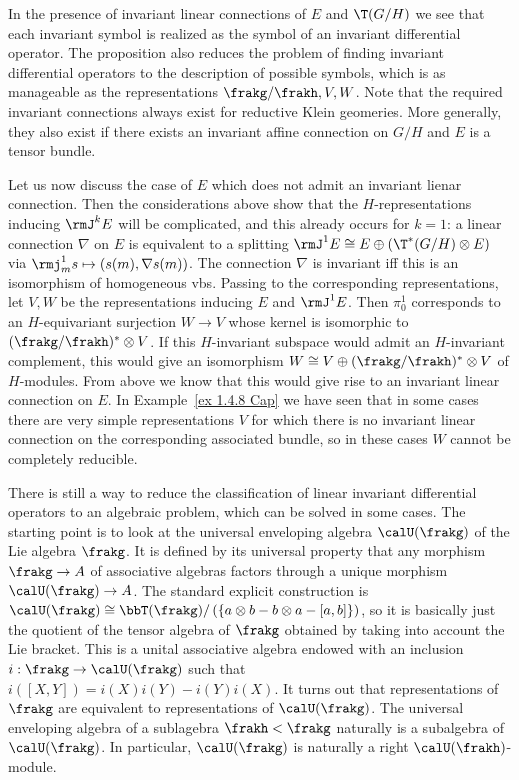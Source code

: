 In the presence of invariant linear connections of $E$ and $\T(G\slash H)$ we see that each invariant symbol is realized as the symbol of an invariant differential operator. The proposition also reduces the problem of finding invariant differential operators to the description of possible symbols, which is as manageable as the representations $\frakg\slash\frakh,V,W$. Note that the required invariant connections always exist for reductive Klein geomeries. More generally, they also exist if there exists an invariant affine connection on $G\slash H$ and $E$ is a tensor bundle.

Let us now discuss the case of $E$ which does not admit an invariant lienar connection. Then the considerations above show that the $H$-representations inducing $\rmJ^k E$ will be complicated, and this already occurs for $k=1$: a linear connection $\nabla$ on $E$ is equivalent to a splitting $\rmJ^1 E\cong E\oplus (\T^\ast (G\slash H)\otimes E)$ via $\rmj^1_m s\mapsto (s(m),\nabla s(m))$. The connection $\nabla$ is invariant iff this is an isomorphism of homogeneous \glspl{vb}. Passing to the corresponding representations, let $V,W$ be the representations inducing $E$ and $\rmJ^1 E$. Then $\pi^1_0$ corresponds to an $H$-equivariant surjection $W\to V$ whose kernel is isomorphic to $(\frakg\slash\frakh)^\ast \otimes V$. If this $H$-invariant subspace would admit an $H$-invariant complement, this would give an isomorphism $W\cong V\oplus (\frakg\slash\frakh)^\ast\otimes V$ of $H$-modules. From above we know that this would give rise to an invariant linear connection on $E$. In Example~\ref{ex 1.4.8 Cap} we have seen that in some cases there are very simple representations $V$ for which there is no invariant linear connection on the corresponding associated bundle, so in these cases $W$ cannot be completely reducible.

There is still a way to reduce the classification of linear invariant differential operators to an algebraic problem, which can be solved in some cases. The starting point is to look at the universal enveloping algebra $\calU(\frakg)$ of the Lie algebra $\frakg$. It is defined by its universal property that any morphism $\frakg\to A$ of associative algebras factors through a unique morphism $\calU(\frakg)\to A$. The standard explicit construction is $\calU(\frakg)\cong \bbT(\frakg)\slash \left(\{a\otimes b-b\otimes a-[a,b]\}\right)$, so it is basically just the quotient of the tensor algebra of $\frakg$ obtained by taking into account the Lie bracket. This is a unital associative algebra endowed with an inclusion $i:\frakg\to \calU(\frakg)$ such that $i([X,Y])=i(X)i(Y)-i(Y)i(X)$. It turns out that representations of $\frakg$ are equivalent to representations of $\calU(\frakg)$. The universal enveloping algebra of a sublagebra $\frakh<\frakg$ naturally is a subalgebra of $\calU(\frakg)$. In particular, $\calU(\frakg)$ is naturally a right $\calU(\frakh)$-module.

